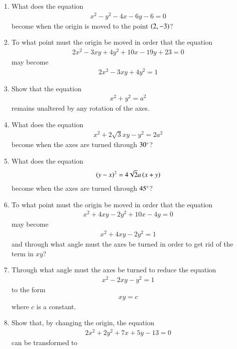 \begin{enumerate}[1.]
\item What does the equation 
\begin{align*}
x^2-y^2-4x-6y-6=0
\end{align*}
become when the origin is moved to the point $\left(2,-3\right)$?
\item To what point must the origin be moved in order that the equation
\begin{align*}
2x^2-3xy+4y^2+10x - 19y + 23 = 0
\end{align*}
may become
\begin{align*}
2x^2-3xy+4y^2 = 1
\end{align*}
\item Show that the equation
\begin{align*}
x^2+y^2 = a^2
\end{align*}
remains unaltered by any rotation of the axes.
\item What does the equation
\begin{align*}
x^2+2\sqrt{3}xy - y^2 = 2a^2
\end{align*}
become when the axes are turned through $30\degree$?
\item What does the equation
\begin{align*}
\left(y-x\right)^2 = 4\sqrt{2}a\left(x+y\right)
\end{align*}
become when the axes are turned through $45\degree$?
\item To what point must the origin be moved in order that the equation
\begin{align*}
x^2+4xy-2y^2+10x-4y = 0
\end{align*}
may become
\begin{align*}
x^2+4xy-2y^2 = 1
\end{align*}
and through what angle must the axes be turned in order to get rid
of the term in $xy$?
\item Through what angle must the axes be turned to reduce the equation
\begin{align*}
x^2-2xy-y^2 = 1
\end{align*}
to the form
\begin{align*}
xy = c
\end{align*}
where $c$ is a constant.
\item Show that, by changing the origin, the equation
\begin{align*}
2x^2+2y^2+7x+5y-13 = 0
\end{align*}
can be transformed to 
\begin{align*}

\end{align*}
\end{enumerate}
